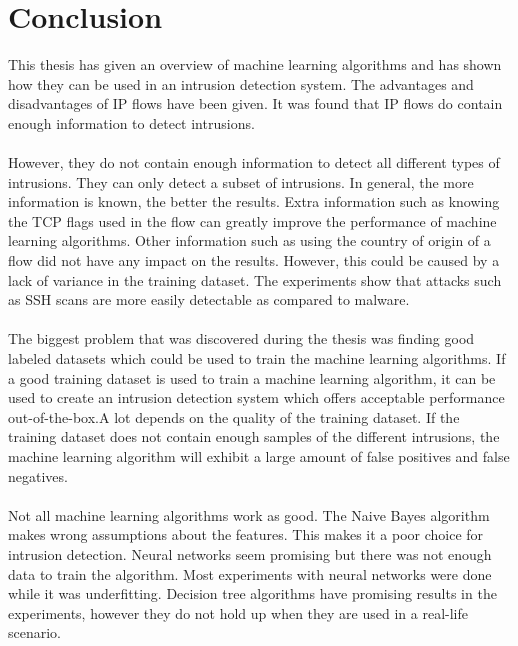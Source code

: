 
\chapter{Conclusion} %

\label{conclusion} %

This thesis has given an overview of machine learning algorithms and has shown how they can be used in an intrusion detection system. The advantages and disadvantages of IP flows have been given. It was found that IP flows do contain enough information to detect intrusions. \\
\\
However, they do not contain enough information to detect all different types of intrusions. They can only detect a subset of intrusions. In general, the more information is known, the better the results. Extra information such as knowing the TCP flags used in the flow can greatly improve the performance of machine learning algorithms. Other information such as using the country of origin of a flow did not have any impact on the results. However, this could be caused by a lack of variance in the training dataset.  The experiments show that attacks such as SSH scans are more easily detectable as compared to malware.\\
\\
The biggest problem that was discovered during the thesis was finding good labeled datasets which could be used to train the machine learning algorithms. If a good training dataset is used to train a machine learning algorithm, it can be used to create an intrusion detection system which offers acceptable performance out-of-the-box.A lot depends on the quality of the training dataset. If the training dataset does not contain enough samples of the different intrusions, the machine learning algorithm will exhibit a large amount of false positives and false negatives. \\
\\
Not all machine learning algorithms work as good. The Naive Bayes algorithm makes wrong assumptions about the features. This makes it a poor choice for intrusion detection. Neural networks seem promising but there was not enough data to train the algorithm. Most experiments with neural networks were done while it was underfitting. Decision tree algorithms have promising results in the experiments, however they do not hold up when they are used in a real-life scenario.  \\
